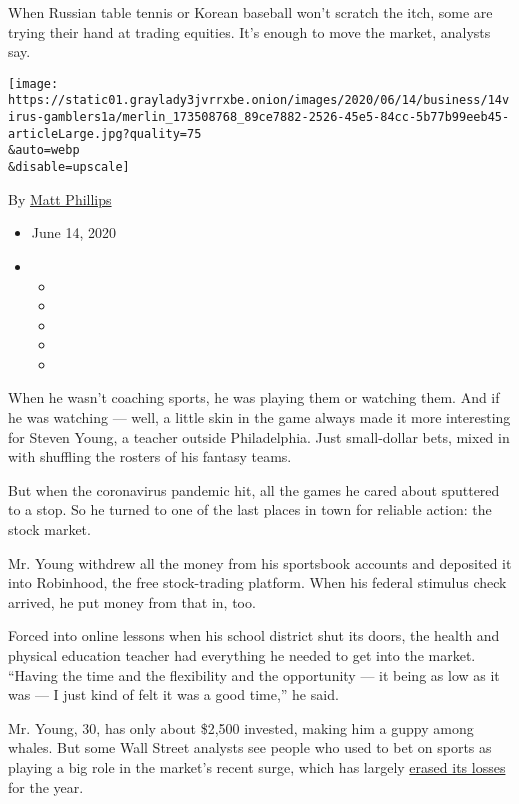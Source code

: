 When Russian table tennis or Korean baseball won't scratch the itch,
some are trying their hand at trading equities. It's enough to move the
market, analysts say.

\texttt{[image: https://static01.graylady3jvrrxbe.onion/images/2020/06/14/business/14virus-gamblers1a/merlin\_173508768\_89ce7882-2526-45e5-84cc-5b77b99eeb45-articleLarge.jpg?quality=75\\\&auto=webp\\\&disable=upscale]}

By \href{https://www.nytimes3xbfgragh.onion/by/matt-phillips}{Matt
Phillips}

\begin{itemize}
\item
  June 14, 2020
\item
  \begin{itemize}
  \item
  \item
  \item
  \item
  \item
  \end{itemize}
\end{itemize}

When he wasn't coaching sports, he was playing them or watching them.
And if he was watching --- well, a little skin in the game always made
it more interesting for Steven Young, a teacher outside Philadelphia.
Just small-dollar bets, mixed in with shuffling the rosters of his
fantasy teams.

But when the coronavirus pandemic hit, all the games he cared about
sputtered to a stop. So he turned to one of the last places in town for
reliable action: the stock market.

Mr. Young withdrew all the money from his sportsbook accounts and
deposited it into Robinhood, the free stock-trading platform. When his
federal stimulus check arrived, he put money from that in, too.

Forced into online lessons when his school district shut its doors, the
health and physical education teacher had everything he needed to get
into the market. ``Having the time and the flexibility and the
opportunity --- it being as low as it was --- I just kind of felt it was
a good time,'' he said.

Mr. Young, 30, has only about \$2,500 invested, making him a guppy among
whales. But some Wall Street analysts see people who used to bet on
sports as playing a big role in the market's recent surge, which has
largely
\href{https://www.nytimes3xbfgragh.onion/2020/06/08/business/recession-stock-market-coronavirus.html}{erased
its losses} for the year.


